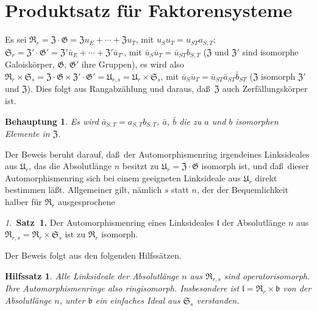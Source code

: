 \documentclass[12pt,a4paper]{article}
\theoremstyle{plain}
\newtheorem{hilfssatz}{Hilfssatz}[section]
\newtheorem{behauptung}{Behauptung}[section]
\theoremstyle{definition}
\theoremstyle{remark}
\begin{document}
\newpage
\section{Produktsatz f\"ur Faktorensysteme}\label{sec:28}

Es sei $\mathfrak{R}_{r} = \mathfrak{Z} \cdot \mathfrak{G} = \mathfrak{Z}u_{E} + \cdots + \mathfrak{Z}u_{T}$,
mit $u_{S}u_{T} = u_{ST}a_{S,T}$; $\mathfrak{S}_{r} = \mathfrak{Z}' \cdot \mathfrak{G}' =
\mathfrak{Z}'\bar{u}_{E} + \cdots + \mathfrak{Z}'\bar{u}_{T'}$, mit
$\bar{u}_{S}\bar{u}_{T} = \bar{u}_{ST}b_{S,T}$ ($\mathfrak{Z}$ und $\mathfrak{Z}'$ sind
isomorphe Galoisk\"orper, $\mathfrak{G}$, $\mathfrak{G}'$ ihre Gruppen), es wird also
$\mathfrak{R}_{r} \times \mathfrak{S}_{s} = \mathfrak{Z} \cdot \mathfrak{G} \times \mathfrak{Z}' \cdot \mathfrak{G}'
= \mathfrak{U}_{r,s} = \mathfrak{U}_{r} \times \mathfrak{S}_{s}$, mit
$\bar{u}_{S}\bar{u}_{T} = \bar{u}_{ST}\bar{a}_{ST}\bar{b}_{ST}$ ($\mathfrak{Z}$ isomorph
$\mathfrak{Z}'$ und $\mathfrak{Z}$). Dies folgt aus Rangabz\"ahlung und daraus, da\ss\ $\mathfrak{Z}$ auch Zerf\"allungsk\"orper ist.

\begin{behauptung}
Es wird $\bar{a}_{S,T} = a_{S,T}b_{S,T}$, $\bar{a}$, $\bar{b}$ die zu $a$ und $b$
isomorphen Elemente in $\mathfrak{Z}$.
\end{behauptung}

Der Beweis beruht darauf, da\ss\ der Automorphismenring irgendeines
Linksideales aus $\mathfrak{U}_{r}$, das die Absolutl\"ange $n$ besitzt zu
$\mathfrak{U}_{r} = \mathfrak{Z} \cdot \mathfrak{G}$ isomorph ist, und da\ss\ dieser
Automorphismenring sich bei einem geeigneten Linksideale aus
$\mathfrak{U}_{r}$ direkt bestimmen l\"a\ss t. Allgemeiner gilt, n\"amlich $s$
statt $n$, der der Bequemlichkeit halber f\"ur $\mathfrak{R}_{r}$ ausgesprochene

\textit{1.}\ \textbf{Satz~1.} Der Automorphismenring eines Linksideales $\mathfrak{l}$ der
Absolutl\"ange $n$ aus $\mathfrak{R}_{r,s} = \mathfrak{R}_{r} \times \mathfrak{S}_{s}$ ist zu
$\mathfrak{R}_{r}$ isomorph.

Der Beweis folgt aus den folgenden Hilfss\"atzen.

\begin{hilfssatz}\label{hilf:28-1}
Alle Linksideale der Absolutl\"ange $n$ aus $\mathfrak{R}_{r,s}$ sind
operatorisomorph. Ihre Automorphismenringe also ringisomorph.
Insbesondere ist $\mathfrak{l} = \mathfrak{R}_{r} \times \mathfrak{b}$ von der Absolutl\"ange
$n$, unter $\mathfrak{b}$ ein einfaches Ideal aus $\mathfrak{S}_{s}$ verstanden.
\end{hilfssatz}
\end{document}
